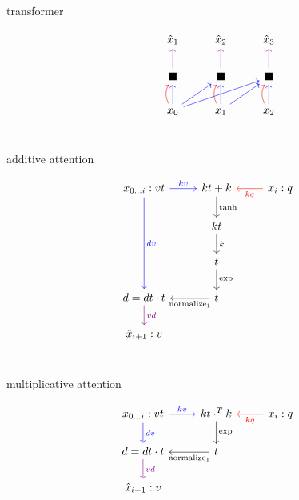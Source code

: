 \documentclass{article}
\begin{document}
transformer

\[\begin{tikzcd}
    &\hat{x}_{1} &\hat{x}_{2} &\hat{x}_{3}\\
    &\blacksquare \ar[violet]{u} &\blacksquare \ar[violet]{u} &\blacksquare \ar[violet]{u}\\
    &x_{0} \ar[red, bend left]{u} \ar[blue]{u} \ar[blue]{ur} \ar[blue]{urr} &x_{1} \ar[red, bend left]{u} \ar[blue]{u} \ar[blue]{ur} &x_{2} \ar[red, bend left]{u} \ar[blue]{u}\\
  \end{tikzcd}\]

additive attention

\[\begin{tikzcd}
    x_{0 \ldots i} : vt \ar[blue]{ddd}{dv} \ar[blue]{r}{kv} &kt + k \ar{d}{\tanh} &x_{i} : q \ar[red]{l}{kq}\\
    &kt \ar{d}{k} &\\
    &t \ar{d}{\exp} &\\
    d = dt \cdot t \ar[violet]{d}{vd} &t \ar{l}{\operatorname{normalize}_{1}} &\\
    \hat{x}_{i+1} : v &&\\
  \end{tikzcd}\]

multiplicative attention

\[\begin{tikzcd}
    x_{0 \ldots i} : vt \ar[blue]{d}{dv} \ar[blue]{r}{kv} &kt \cdot^{T} k \ar{d}{\exp} &x_{i} : q \ar[red]{l}{kq}\\
    d = dt \cdot t \ar[violet]{d}{vd} &t \ar{l}{\operatorname{normalize}_{1}} &\\
    \hat{x}_{i+1} : v &&\\
  \end{tikzcd}\]
\end{document}
